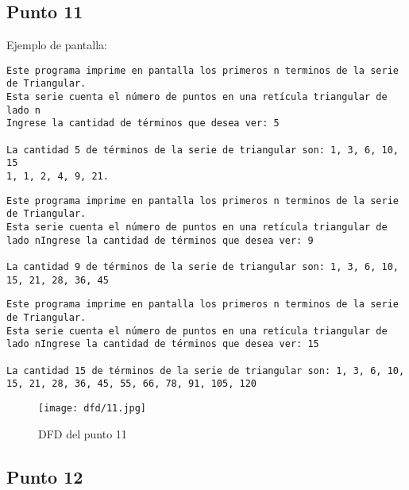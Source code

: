 



\subsection{Punto 11}
	
	Ejemplo de pantalla:
\begin{lstlisting}
Este programa imprime en pantalla los primeros n terminos de la serie de Triangular.
Esta serie cuenta el número de puntos en una retícula triangular de lado n
Ingrese la cantidad de términos que desea ver: 5

La cantidad 5 de términos de la serie de triangular son: 1, 3, 6, 10, 15
1, 1, 2, 4, 9, 21.
\end{lstlisting}

\begin{lstlisting}
Este programa imprime en pantalla los primeros n terminos de la serie de Triangular.
Esta serie cuenta el número de puntos en una retícula triangular de lado nIngrese la cantidad de términos que desea ver: 9

La cantidad 9 de términos de la serie de triangular son: 1, 3, 6, 10, 15, 21, 28, 36, 45
\end{lstlisting}

\begin{lstlisting}
Este programa imprime en pantalla los primeros n terminos de la serie de Triangular.
Esta serie cuenta el número de puntos en una retícula triangular de lado nIngrese la cantidad de términos que desea ver: 15

La cantidad 15 de términos de la serie de triangular son: 1, 3, 6, 10, 15, 21, 28, 36, 45, 55, 66, 78, 91, 105, 120
\end{lstlisting}

\begin{figure}
    \centering
    \texttt{[image: dfd/11.jpg]}
    \caption{ DFD del punto 11}
    \label{fig: DFD del punto 11}
\end{figure}




\subsection{Punto 12}
	
